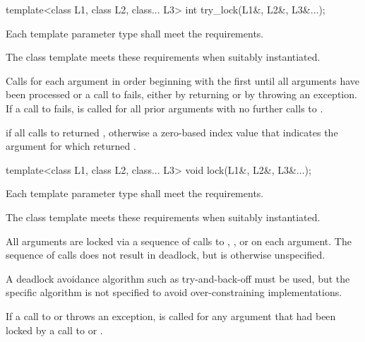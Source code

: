 %
\begin{itemdecl}
template<class L1, class L2, class... L3> int try_lock(L1&, L2&, L3&...);
\end{itemdecl}

\begin{itemdescr}
\pnum
\requires Each template parameter type shall meet the  requirements.
\begin{note}
The
 class template meets these requirements when suitably instantiated.
\end{note}

\pnum
\effects
Calls  for each argument in order beginning with the
first until all arguments have been processed or a call to  fails,
either by returning  or by throwing an exception. If a call to
 fails,  is called for all prior arguments
with no further calls to .

\pnum
\returns
{} if all calls to  returned ,
otherwise a zero-based index value that indicates the argument for which 
returned .
\end{itemdescr}

%
\begin{itemdecl}
template<class L1, class L2, class... L3> void lock(L1&, L2&, L3&...);
\end{itemdecl}

\begin{itemdescr}
\pnum
\requires Each template parameter type shall meet the  requirements.
\begin{note}
The
 class template meets these requirements when suitably instantiated.
\end{note}

\pnum
\effects
All arguments are locked via a sequence of calls to ,
, or  on each argument. The sequence of calls does
not result in deadlock, but is otherwise unspecified.
\begin{note}
A deadlock avoidance
algorithm such as try-and-back-off must be used, but the specific algorithm is not
specified to avoid over-constraining implementations.
\end{note}
If a call to
 or  throws an exception,  is
called for any argument that had been locked by a call to  or
.
\end{itemdescr}


